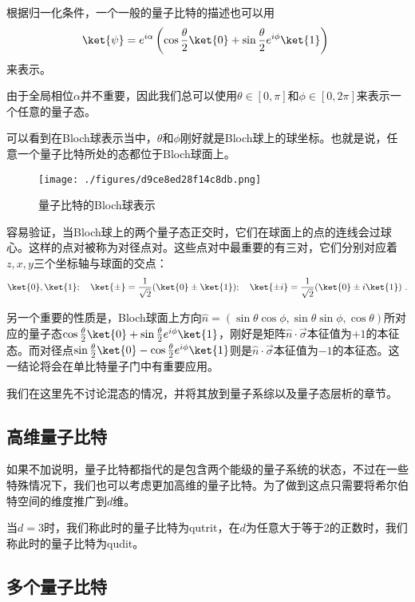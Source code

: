 根据归一化条件，一个一般的量子比特的描述也可以用
\begin{equation}
\ket{\psi}=e^{i\alpha}\left(\cos\frac{\theta}{2}\ket{0}+\sin\frac{\theta}{2}e^{i\phi}\ket{1}\right)~
\end{equation}
来表示。

由于全局相位$\alpha$并不重要，因此我们总可以使用$\theta\in[0,\pi]$和$\phi\in[0,2\pi]$来表示一个任意的量子态。

可以看到在Bloch球表示当中，$\theta$和$\phi$刚好就是Bloch球上的球坐标。也就是说，任意一个量子比特所处的态都位于Bloch球面上。

\begin{figure}[ht]
\centering
\texttt{[image: ./figures/d9ce8ed28f14c8db.png]}
\caption{量子比特的Bloch球表示} \label{fig_Qubit}
\end{figure}

容易验证，当Bloch球上的两个量子态正交时，它们在球面上的点的连线会过球心。这样的点对被称为对径点对。这些点对中最重要的有三对，它们分别对应着$z,x,y$三个坐标轴与球面的交点：
\begin{equation}
\ket{0},\ket{1};\quad \ket{\pm}=\frac{1}{\sqrt{2}}(\ket{0}\pm\ket{1});\quad \ket{\pm i}=\frac{1}{\sqrt{2}}(\ket{0}\pm i\ket{1})~.
\end{equation}

另一个重要的性质是，Bloch球面上方向$\hat{n}=(\sin\theta\cos\phi,\sin\theta\sin\phi,\cos\theta)$所对应的量子态$\cos\frac{\theta}{2}\ket{0}+\sin\frac{\theta}{2}e^{i\phi}\ket{1}$，刚好是矩阵$\hat{n}\cdot\vec{\sigma}$本征值为$+1$的本征态。而对径点$\sin\frac{\theta}{2}\ket{0}-\cos\frac{\theta}{2}e^{i\phi}\ket{1}$则是$\hat{n}\cdot\vec{\sigma}$本征值为$-1$的本征态。这一结论将会在单比特量子门中有重要应用。

我们在这里先不讨论混态的情况，并将其放到量子系综以及量子态层析的章节。

\subsection{高维量子比特}

如果不加说明，量子比特都指代的是包含两个能级的量子系统的状态，不过在一些特殊情况下，我们也可以考虑更加高维的量子比特。为了做到这点只需要将希尔伯特空间的维度推广到$d$维。

当$d=3$时，我们称此时的量子比特为qutrit，在$d$为任意大于等于2的正数时，我们称此时的量子比特为qudit。

\subsection{多个量子比特}

